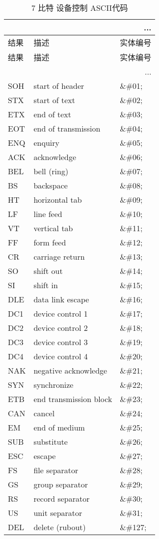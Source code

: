 \begin{longtable}{|l|l|l|}
\multicolumn{3}{r}{...}
\tabularnewline\hline
结果		&描述	&实体编号
\endhead

\caption{7 比特 设备控制 ASCII代码}\\
\hline
结果		&描述	&实体编号
\tabularnewline\hline
\endfirsthead

\multicolumn{3}{r}{...}
\endfoot

\endlastfoot
\hline
NUL		&null character		&\&\#00;\\
\hline
SOH		&start of header		&\&\#01;\\
\hline
STX		&start of text			&\&\#02;\\
\hline
ETX		&end of text			&\&\#03;\\
\hline
EOT		&end of transmission	&\&\#04;\\
\hline
ENQ		&enquiry				&\&\#05;\\
\hline
ACK		&acknowledge		&\&\#06;\\
\hline
BEL		&bell (ring)			&\&\#07;\\
\hline
BS		&backspace			&\&\#08;\\
\hline
HT		&horizontal tab		&\&\#09;\\
\hline
LF		&line feed			&\&\#10;\\
\hline
VT		&vertical tab			&\&\#11;\\
\hline
FF		&form feed			&\&\#12;\\
\hline
CR		&carriage return		&\&\#13;\\
\hline
SO		&shift out			&\&\#14;\\
\hline
SI		&shift in				&\&\#15;\\
\hline
DLE		&data link escape		&\&\#16;\\
\hline
DC1		&device control 1		&\&\#17;\\
\hline
DC2		&device control 2		&\&\#18;\\
\hline
DC3		&device control 3		&\&\#19;\\
\hline
DC4		&device control 4		&\&\#20;\\
\hline
NAK		&negative acknowledge	&\&\#21;\\
\hline
SYN		&synchronize			&\&\#22;\\
\hline
ETB		&end transmission block	&\&\#23;\\
\hline
CAN		&cancel				&\&\#24;\\
\hline
EM		&end of medium		&\&\#25;\\
\hline
SUB		&substitute			&\&\#26;\\
\hline
ESC		&escape				&\&\#27;\\
\hline
FS		&file separator		&\&\#28;\\
\hline
GS		&group separator		&\&\#29;\\
\hline
RS		&record separator		&\&\#30;\\
\hline
US		&unit separator		&\&\#31;\\
\hline
DEL		&delete (rubout)		&\&\#127;\\
\hline
\end{longtable}



